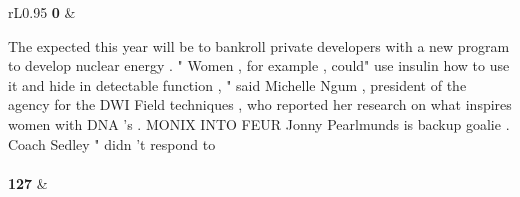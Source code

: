 {\begin{tabular}{rL{0.95\linewidth}}
\textbf{0} &\strut{}The expected this year will be to bankroll private developers with a new program to develop nuclear energy . " Women , for example , could" use insulin how to use it and hide in detectable function , " said Michelle Ngum , president of the agency for the DWI Field techniques , who reported her research on what inspires women with DNA 's . MONIX INTO FEUR Jonny Pearlmunds is backup goalie . Coach Sedley " didn 't respond to\\
\hline\\
\textbf{127} &\strut{}\smallmasktok{}\smallmasktok{}\smallmasktok{}\smallmasktok{}\smallmasktok{}\smallmasktok{}\smallmasktok{}\smallmasktok{}\smallmasktok{}\smallmasktok{}\smallmasktok{}\smallmasktok{}\smallmasktok{}\smallmasktok{}\smallmasktok{}\smallmasktok{}\smallmasktok{}\smallmasktok{}\smallmasktok{}\smallmasktok{}\smallmasktok{}\smallmasktok{}\smallmasktok{}\smallmasktok{}\smallmasktok{}\smallmasktok{}\smallmasktok{}\smallmasktok{}\smallmasktok{}\smallmasktok{}\smallmasktok{}\smallmasktok{}\smallmasktok{}\smallmasktok{}\smallmasktok{}\smallmasktok{}\smallmasktok{}\smallmasktok{}\smallmasktok{}\smallmasktok{}\smallmasktok{}\smallmasktok{}\smallmasktok{}\smallmasktok{}\smallmasktok{}\smallmasktok{}\smallmasktok{}\smallmasktok{}\smallmasktok{}\smallmasktok{}\smallmasktok{}\smallmasktok{}\smallmasktok{}\smallmasktok{}\smallmasktok{}\smallmasktok{}\smallmasktok{}\smallmasktok{}\smallmasktok{}\smallmasktok{}\smallmasktok{}\smallmasktok{}\smallmasktok{}\smallmasktok{}\smallmasktok{}\smallmasktok{}\smallmasktok{}\smallmasktok{}\smallmasktok{}\smallmasktok{}\smallmasktok{}\smallmasktok{}\smallmasktok{}\smallmasktok{}\smallmasktok{}\smallmasktok{}\smallmasktok{}\smallmasktok{}\smallmasktok{}\smallmasktok{}\smallmasktok{}\smallmasktok{}\smallmasktok{}\smallmasktok{}\smallmasktok{}\smallmasktok{}\smallmasktok{}\smallmasktok{}\smallmasktok{}\smallmasktok{}\smallmasktok{}\smallmasktok{}\smallmasktok{}\smallmasktok{}\smallmasktok{}\smallmasktok{}\smallmasktok{}\smallmasktok{}\smallmasktok{}\smallmasktok{}\smallmasktok{}\smallmasktok{}\smallmasktok{}\smallmasktok{}\smallmasktok{}\smallmasktok{}\smallmasktok{}\smallmasktok{}\smallmasktok{}\smallmasktok{}\smallmasktok{}\smallmasktok{}\smallmasktok{}\smallmasktok{}\smallmasktok{}\smallmasktok{}\smallmasktok{}\smallmasktok{}\smallmasktok{}\smallmasktok{}\smallmasktok{}\smallmasktok{}\smallmasktok{}\smallmasktok{}\smallmasktok{}\smallmasktok{}\smallmasktok{}\\

\end{tabular}}
